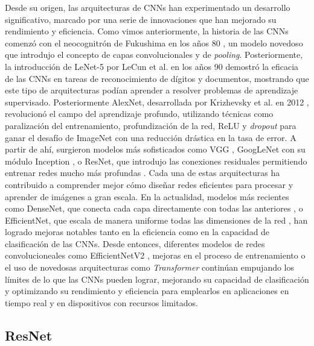 Desde su origen, las arquitecturas de CNNs han experimentado un desarrollo significativo, marcado por una serie de innovaciones que han mejorado su rendimiento y eficiencia. Como vimos anteriormente, la historia de las CNNs comenzó con el neocognitrón de Fukushima en los años 80 \cite{fukushima1980neocognitron}, un modelo novedoso que introdujo el concepto de capas convolucionales y de \textit{pooling}. Posteriormente, la introducción de LeNet-5 por LeCun et al. en los años 90 \cite{lecun1998gradient} demostró la eficacia de las CNNs en tareas de reconocimiento de dígitos y documentos, mostrando que este tipo de arquitecturas podían aprender a resolver problemas de aprendizaje supervisado. Posteriormente AlexNet, desarrollada por Krizhevsky et al. en 2012 \cite{krizhevsky2012imagenet}, revolucionó el campo del aprendizaje profundo, utilizando técnicas como paralización del entrenamiento, profundización de la red, ReLU y \textit{dropout} para ganar el desafío de ImageNet con una reducción drástica en la tasa de error. A partir de ahí, surgieron modelos más sofisticados como VGG \cite{simonyan2014very}, GoogLeNet con su módulo Inception \cite{szegedy2015going}, o ResNet, que introdujo las conexiones residuales permitiendo entrenar redes mucho más profundas \cite{he2016deep}. Cada una de estas arquitecturas ha contribuido a comprender mejor cómo diseñar redes eficientes para procesar y aprender de imágenes a gran escala. En la actualidad, modelos más recientes como DenseNet, que conecta cada capa directamente con todas las anteriores \cite{huang2017densely}, o EfficientNet, que escala de manera uniforme todas las dimensiones de la red \cite{tan2019efficientnet}, han logrado mejoras notables tanto en la eficiencia como en la capacidad de clasificación de las CNNs. Desde entonces, diferentes modelos de redes convolucioneales como EfficientNetV2 \cite{tan2021efficientnetv2smallermodelsfaster}, mejoras en el proceso de entrenamiento \cite{pham2021metapseudolabels} o el uso de novedosas arquitecturas como \textit{Transformer} \cite{NIPS2017_3f5ee243, dosovitskiy2021imageworth16x16words} continúan empujando los límites de lo que las CNNs pueden lograr, mejorando su capacidad de clasificación y optimizando su rendimiento y eficiencia para emplearlos en aplicaciones en tiempo real y en dispositivos con recursos limitados.

\subsection{ResNet}

